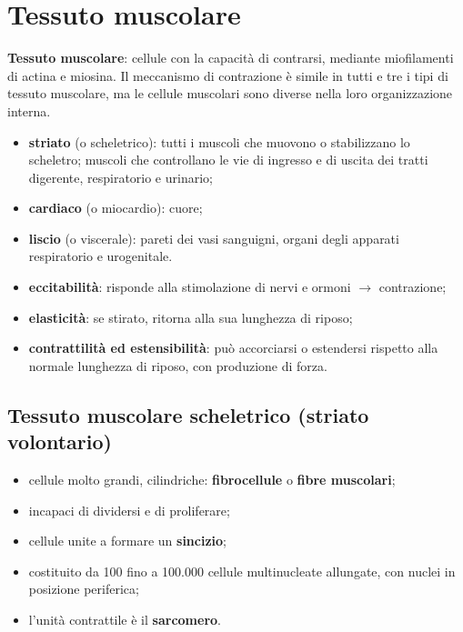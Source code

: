 \section{Tessuto muscolare}

\textbf{Tessuto muscolare}: cellule con la capacità di contrarsi, mediante miofilamenti di actina e miosina. Il meccanismo di contrazione è simile in tutti e tre i tipi di tessuto muscolare, ma le cellule muscolari sono diverse nella loro organizzazione interna.

\begin{itemize}
  \item \textbf{striato} (o scheletrico): tutti i muscoli che muovono o stabilizzano lo scheletro; muscoli che controllano le vie di ingresso e di uscita dei tratti digerente, respiratorio e urinario;
  \item \textbf{cardiaco} (o miocardio): cuore;
  \item \textbf{liscio} (o viscerale): pareti dei vasi sanguigni, organi degli apparati respiratorio e urogenitale.
\end{itemize}

\begin{itemize}
  \item \textbf{eccitabilità}: risponde alla stimolazione di nervi e ormoni $\rightarrow$ contrazione;
  \item \textbf{elasticità}: se stirato, ritorna alla sua lunghezza di riposo;
  \item \textbf{contrattilità ed estensibilità}: può accorciarsi o estendersi rispetto alla normale lunghezza di riposo, con produzione di forza.
\end{itemize}

\subsection{Tessuto muscolare scheletrico (striato volontario)}

\begin{itemize}
  \item cellule molto grandi, cilindriche: \textbf{fibrocellule} o \textbf{fibre muscolari};
  \item incapaci di dividersi e di proliferare;
  \item cellule unite a formare un \textbf{sincizio};
  \item costituito da 100 fino a 100.000 cellule multinucleate allungate, con nuclei in posizione periferica;
  \item l'unità contrattile è il \textbf{sarcomero}.
\end{itemize}

